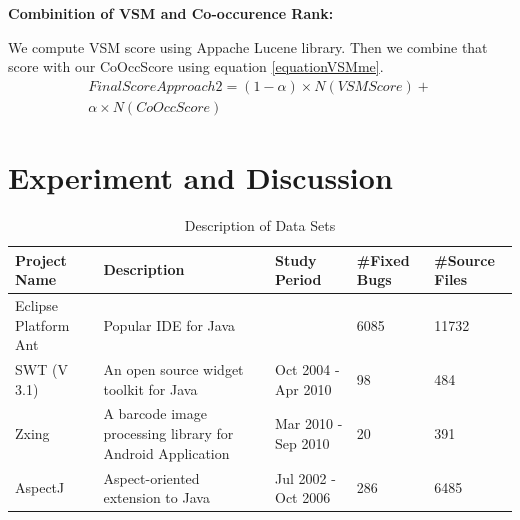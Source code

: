 \documentclass[conference]{IEEEtran}
\begin{document}
\textbf{Combinition of VSM and Co-occurence Rank:}

We compute VSM score using Appache Lucene library. Then we combine that score with our CoOccScore using equation \ref{equationVSMme}.
\begin{multline}\label{equationVSMme}
FinalScoreApproach2=(1-\alpha )\times N(VSMScore)+ \\
\alpha \times N(CoOccScore)
\end{multline}


\section{Experiment and Discussion}






\begin{table}[htbp]
\caption{Description of Data Sets}
\label{tab:DDSl}
\begin{center}
\begin{tabular}{ p{1cm} | p{2.5cm} | p{1.5cm} | p{.75cm} | p{.75cm} }
\hline
\textbf{Project Name}  & \textbf{Description} & \textbf{Study Period}& \textbf{\#Fixed Bugs} & \textbf{\#Source Files}\\
\hline
{Eclipse Platform Ant} & Popular IDE for Java & & {6085} & 11732\\ \hline
 SWT (V 3.1)& An open source widget toolkit for Java & Oct 2004 - Apr 2010 & 98 & 484 \\ \hline
 Zxing & A barcode image processing library for Android Application & Mar 2010 - Sep 2010 & 20 & 391 \\
\hline
AspectJ & Aspect-oriented extension to Java & Jul 2002 - Oct 2006 & 286 & 6485 \\ \hline
\end{tabular}
\end{center}
\end{table}
\end{document}
